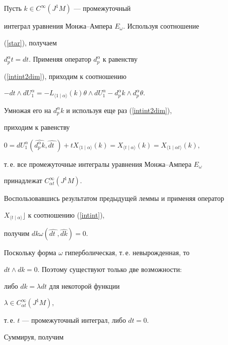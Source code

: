 \begin{pf}


Пусть $k\in C^\infty (J^1M)$ --- промежуточный 


интеграл уравнения Монжа--Ампера $E_\omega$. Используя соотношение


(\ref{star}), получаем


$d_p^\alpha t=dt$. Применяя оператор $d_p^\alpha $ к равенству 


(\ref{intint2dim}), приходим к соотношению


$-dt\wedge dU_1^\alpha =-L_{\langle 1\mid \alpha\rangle}(k)\theta


\wedge dU_1^\alpha-d_p^\alpha k\wedge d_p^\alpha \theta.$


Умножая его на $d_p^\alpha k$ и используя еще раз (\ref{intint2dim}), 


приходим к равенству


$0=dU_1^\alpha (\widehat{d_p^\alpha k},


\widehat{dt\phantom{.}})+tX_{\langle 1\mid \alpha


\rangle}(k)=X_{\langle t\mid \alpha \rangle}(k)=


X_{\langle 1\mid \alpha t\rangle}(k),$


т.\,е. все промежуточные интегралы уравнения Монжа--Ампера $E_\omega$ 


принадлежат $C_{\alpha t}^\infty (J^1M)$.


\end{pf}





Воспользовавшись результатом предыдущей леммы и применяя оператор 


$X_{\langle t\mid \alpha\rangle}\rfloor$ к соотношению (\ref{intint}),


получим $dk\omega (\widehat{dt\phantom{.}},\widehat{dk})=0.$


Поскольку форма $\omega$ гиперболическая, т.\,е. невырожденная, то 


$dt\wedge dk=0$. Поэтому существуют только две возможности:


либо $dk=\lambda dt$ для некоторой функции 


$\lambda \in C_{\alpha t}^\infty (J^1M)$,


т.\,е. $t$ --- промежуточный интеграл, либо $dt=0$.





Суммируя, получим





